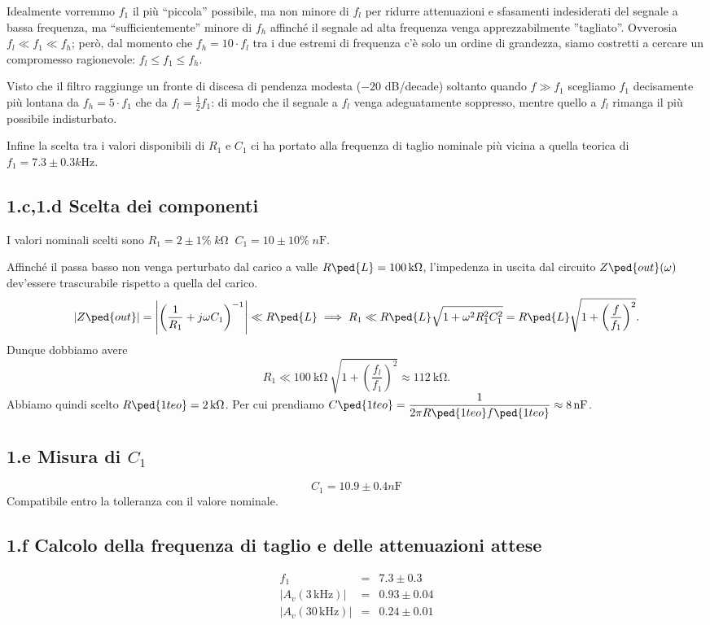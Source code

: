 \documentclass[10pt,a4paper]{article}
\begin{document}
Idealmente vorremmo $f_1 $ il più ``piccola'' possibile, ma non minore
di $ f_l $ per ridurre attenuazioni e sfasamenti indesiderati del segnale
a bassa frequenza, ma ``sufficientemente'' minore di $f_h $ affinché il
segnale ad alta frequenza venga apprezzabilmente ''tagliato''. Ovverosia
$f_l \ll f_1 \ll f_h$; però, dal momento che $f_h = 10 \cdot f_l$ tra i due
estremi di frequenza c'è solo un ordine di grandezza, siamo costretti a
cercare un compromesso ragionevole: $f_l \leq f_1 \leq f_h$.

Visto che il filtro raggiunge un fronte di discesa di pendenza modesta
($-20$ dB/decade) soltanto quando $f \gg f_1$ scegliamo $f_1$ decisamente
più lontana da $f_h = 5 \cdot f_1$ che da $f_l = \frac{1}{2} f_1$:
di modo che il segnale a $f_l$ venga adeguatamente soppresso, mentre quello
a $f_l$ rimanga il più possibile indisturbato.

Infine la scelta tra i valori disponibili di $R_1$ e $C_1$ ci ha portato alla
frequenza di taglio nominale più vicina a quella teorica di 
$f_1 = 7.3 \pm 0.3 \si{k\Hz}.$ 

\subsection*{1.c,1.d Scelta dei componenti}

I valori nominali scelti sono $R_1 = 2 \pm 1\% \; \si{k\ohm} \;\; 
C_1 = 10 \pm 10\% \; \si{n\F}$.  

Affinché il passa basso non venga perturbato dal carico a valle
$R\ped{L} = \SI{100}{\kilo\ohm}$, l'impedenza in uscita dal circuito
$Z\ped{out}(\omega)$ dev'essere trascurabile rispetto a quella del carico.
\[
\abs{Z\ped{out}} = \abs{\left(\frac{1}{R_{1}} + j\omega 
C_{1}\right)^{-1}} \ll R\ped{L} \implies R_{1} \ll
R\ped{L} \sqrt{1 + \omega^{2} R_{1}^{2} C_{1}^{2}} =
R\ped{L} \sqrt{1 + \left(\frac{f}{f_1}\right)^{2}}.
\]
Dunque dobbiamo avere
\[
R_{1} \ll \SI{100}{\kilo\ohm}  \ \sqrt{1 + 
\left(\frac{f_l}{f_1}\right)^2} \approx \SI{112}{\kilo\ohm}.
\]
Abbiamo quindi scelto $R\ped{1 teo} = \SI{2}{\kilo\ohm}$.
Per cui prendiamo $C\ped{1 teo} =
\ds \frac{1}{2\pi R\ped{1 teo} f\ped{1 teo}} \approx \SI{8}{\nano\farad}$. 
\subsection*{1.e Misura di $C_1$}
\[
C_1 = 10.9 \pm 0.4 \si{n\F}
\]
Compatibile entro la tolleranza con il valore nominale.

\subsection*{1.f Calcolo della frequenza di taglio e delle attenuazioni attese}
\[
\begin{array}{rcl}
f_1 &=& 7.3 \pm 0.3\\
|A_v(3\,\mathrm{kHz})| &=& 0.93 \pm 0.04 \\
|A_v(30\,\mathrm{kHz})| &=& 0.24 \pm 0.01
\end{array}
\]
\end{document}
